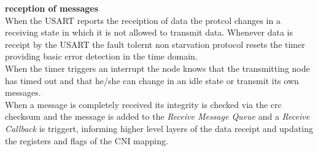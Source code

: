 \textbf{reception of messages}\\
When the USART reports the receiption of data the protcol changes in a receiving state in which it is not allowed to transmit data.
Whenever data is receipt by the USART the fault tolernt non starvation protocol resets the timer providing basic error detection in the time domain.\\

When the timer triggers an interrupt the node knows that the transmitting node has timed out and that he/she can change in an idle state or transmit its own messages.\\

When a message is completely received its integrity is checked via the crc checksum and the message is added to the \textit{Receive Message Queue} and a \textit{Receive Callback} is triggert, informing higher level layers of the data receipt and updating the registers and flags of the CNI mapping.


% 
% 
% 

 